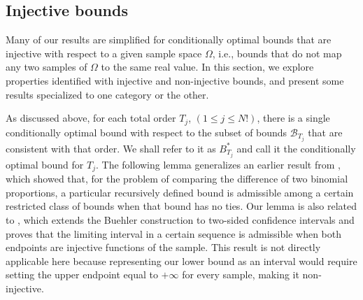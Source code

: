 \documentclass{article}
\theoremstyle{definition}
\theoremstyle{remark}
\begin{document}
\subsection{Injective bounds}
Many of our results are simplified for conditionally optimal bounds that are injective with respect to a given sample space $\Omega$, i.e., bounds that do not map any two samples of $\Omega$ to the same real value. In this section, we explore properties identified with injective and non-injective bounds, and present some results specialized to one category or the other.

As discussed above, for each total order $T_j$, $(1\leq j \leq N!)$, there is a single conditionally optimal bound with respect to the subset of bounds $\mathcal{B}_{T_j}$ that are consistent with that order. We shall refer to it as $B^*_{T_j}$ and call it the conditionally optimal bound for $T_j$.  
The following lemma generalizes an earlier result from \cite{Wang2010}, which showed that, for the problem of comparing the difference of two binomial proportions, a particular recursively defined bound is admissible among a certain restricted class of bounds when that bound has no ties. 
Our lemma is also related to \cite{Wang2023}, which extends the Buehler construction to two-sided confidence intervals and proves that the limiting interval in a certain sequence is admissible when both endpoints are injective functions of the sample. This result is not directly applicable here because representing our lower bound as an interval would require setting the upper endpoint equal to $+\infty$ for every sample, making it non-injective.
\color{black}
\end{document}
